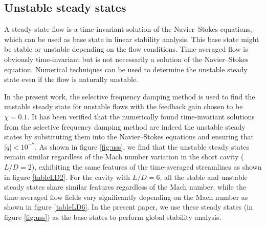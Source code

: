 \documentclass{jfm}
\begin{document}
\subsection{Unstable steady states}
A steady-state flow is a time-invariant solution of the Navier--Stokes equations, which can be used as base state in linear stability analysis. This base state might be stable or unstable depending on the flow conditions. Time-averaged flow is obviously time-invariant but is not necessarily a solution of the Navier--Stokes equation. Numerical techniques can be used to determine the unstable steady state even if the flow is naturally unstable. 

In the present work, the selective frequency damping method \citep{Akervik:PF06} is used to find the unstable steady state for unstable flows with the feedback gain chosen to be $\chi=0.1$. It has been verified that the numerically found time-invariant solutions from the selective frequency damping method are indeed the unstable steady states by substituting them into the Navier--Stokes equations and ensuring that $|\dot q|<10^{-7}$. As shown in figure \ref{fig:uss}, we find that the unstable steady states remain similar regardless of the Mach number variation in the short cavity ($L/D=2$), exhibiting the same features of the time-averaged streamlines as shown in figure \ref{tableLD2}. For the cavity with $L/D=6$, all the stable and unstable steady states share similar features regardless of the Mach number, while the time-averaged flow fields vary significantly depending on the Mach number as shown in figure \ref{tableLD6}.  In the present paper, we use these steady states (in figure \ref{fig:uss}) as the base states to perform global stability analysis. 
\end{document}
